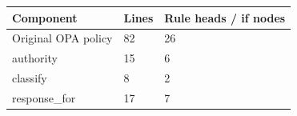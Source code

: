 \begin{tabular}{lll}
\hline
Component & Lines & Rule heads / if nodes \\
\hline
Original OPA policy & 82 & 26 \\
authority & 15 & 6 \\
classify & 8 & 2 \\
response\_for & 17 & 7 \\
\hline
\end{tabular}
